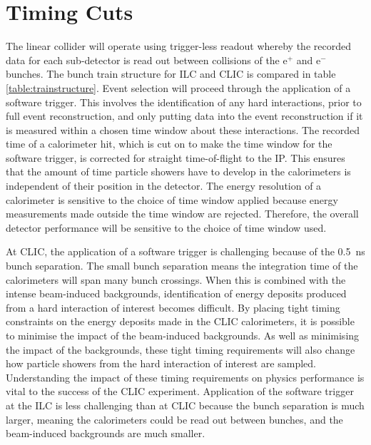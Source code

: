 
\section{Timing Cuts}
The linear collider will operate using trigger-less readout whereby the recorded data for each sub-detector is read out between collisions of the $\text{e}^{+}$ and $\text{e}^{-}$ bunches.  The bunch train structure for ILC and CLIC is compared in table \ref{table:trainstructure}.  Event selection will proceed through the application of a software trigger.  This involves the identification of any hard interactions, prior to full event reconstruction, and only putting data into the event reconstruction if it is measured within a chosen time window about these interactions.  The recorded time of a calorimeter hit, which is cut on to make the time window for the software trigger, is corrected for straight time-of-flight to the IP.  This ensures that the amount of time particle showers have to develop in the calorimeters is independent of their position in the detector.  The energy resolution of a calorimeter is sensitive to the choice of time window applied because energy measurements made outside the time window are rejected.  Therefore, the overall detector performance will be sensitive to the choice of time window used.  

At CLIC, the application of a software trigger is challenging because of the 0.5~ns bunch separation.  The small bunch separation means the integration time of the calorimeters will span many bunch crossings.  When this is combined with the intense beam-induced backgrounds, identification of energy deposits produced from a hard interaction of interest becomes difficult.  By placing tight timing constraints on the energy deposits made in the CLIC calorimeters, it is possible to minimise the impact of the beam-induced backgrounds.  As well as minimising the impact of the backgrounds, these tight timing requirements will also change how particle showers from the hard interaction of interest are sampled.  Understanding the impact of these timing requirements on physics performance is vital to the success of the CLIC experiment.  Application of the software trigger at the ILC is less challenging than at CLIC because the bunch separation is much larger, meaning the calorimeters could be read out between bunches, and the beam-induced backgrounds are much smaller.  

